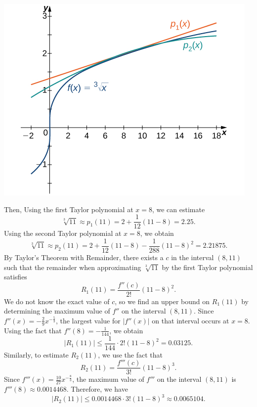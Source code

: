 \documentclass{report}
\begin{document}
    \begin{minipage}[]{0.47\textwidth}
     \begin{center}
        \includegraphics[scale=1]{./figures/web.jpeg}
    \end{center}
   \end{minipage}
   \bigbreak \noindent 
   Then, Using the first Taylor polynomial at $x=8$, we can estimate
    \[
    \sqrt[3]{11} \approx p_1(11) = 2 + \frac{1}{12}(11 - 8) = 2.25.
    \]
    Using the second Taylor polynomial at $x=8$, we obtain
    \[
    \sqrt[3]{11} \approx p_2(11) = 2 + \frac{1}{12}(11 - 8) - \frac{1}{288}(11 - 8)^2 = 2.21875.
    \]
    \bigbreak \noindent By Taylor’s Theorem with Remainder, there exists a $c$ in the interval $(8,11)$ such that the remainder when approximating $\sqrt[3]{11}$ by the first Taylor polynomial satisfies
    \[
    R_1(11) = \frac{f''(c)}{2!}(11 - 8)^2.
    \]
    We do not know the exact value of $c$, so we find an upper bound on $R_1(11)$ by determining the maximum value of $f''$ on the interval $(8,11)$. Since $f''(x) = -\frac{2}{9}x^{-\frac{5}{3}}$, the largest value for $|f''(x)|$ on that interval occurs at $x=8$. Using the fact that $f''(8) = -\frac{1}{144}$, we obtain
    \[
    |R_1(11)| \leq \frac{1}{144} \cdot 2!(11 - 8)^2 = 0.03125.
    \]
    Similarly, to estimate $R_2(11)$, we use the fact that
    \[
    R_2(11) = \frac{f'''(c)}{3!}(11 - 8)^3.
    \]
    Since $f'''(x) = \frac{10}{27}x^{-\frac{8}{3}}$, the maximum value of $f'''$ on the interval $(8,11)$ is $f'''(8) \approx 0.0014468$. Therefore, we have
    \[
    |R_2(11)| \leq 0.0014468 \cdot 3!(11 - 8)^3 \approx 0.0065104.
    \]
\end{document}
